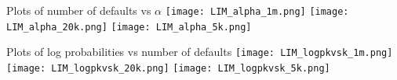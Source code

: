\begin{frame}{Plots of number of defaults vs $\alpha$}
	\texttt{[image: LIM\_alpha\_1m.png]}
	\texttt{[image: LIM\_alpha\_20k.png]}
	\texttt{[image: LIM\_alpha\_5k.png]}
\end{frame}

\begin{frame}{Plots of log probabilities vs number of defaults}
	\texttt{[image: LIM\_logpkvsk\_1m.png]}
	\texttt{[image: LIM\_logpkvsk\_20k.png]}
	\texttt{[image: LIM\_logpkvsk\_5k.png]}
\end{frame}

